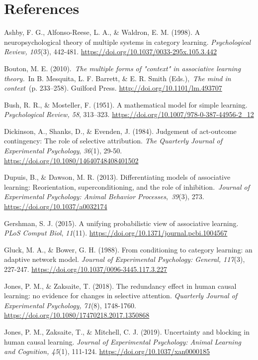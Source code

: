 \documentclass[twocolumn]{article}
\begin{document}
\section*{References}

\begin{hangparas}{1em}{1}

Ashby, F. G., Alfonso-Reese, L. A., \& Waldron, E. M. (1998). A
neuropsychological theory of multiple systems in category learning.
\emph{Psychological Review, 105}(3), 442-481.
\url{https://doi.org/10.1037/0033-295x.105.3.442}

Bouton, M. E. (2010).~\emph{\emph{The multiple forms of "context" in
associative learning theory.}}~In B. Mesquita, L. F. Barrett, \& E. R.
Smith (Eds.),~\emph{\emph{The mind in context}}~(p. 233--258). Guilford
Press. \url{http://doi.org/10.1101/lm.493707}

Bush, R. R., \& Mosteller, F. (1951). A mathematical model for simple
learning. \emph{Psychological Review, 58}, 313--323.
\url{https://doi.org/10.1007/978-0-387-44956-2_12}

Dickinson, A., Shanks, D., \& Evenden, J. (1984). Judgement of
act-outcome contingency: The role of selective attribution. \emph{The
Quarterly Journal of Experimental Psychology}, \emph{36}(1), 29-50.
\url{https://doi.org/10.1080/14640748408401502}

Dupuis, B., \& Dawson, M. R. (2013). Differentiating models of
associative learning: Reorientation, superconditioning, and the role of
inhibition.~\emph{Journal of Experimental Psychology: Animal Behavior
Processes},~\emph{39}(3), 273. \url{https://doi.org/10.1037/a0032174}

Gershman, S. J. (2015). A unifying probabilistic view of associative
learning. \emph{PLoS Comput Biol}, \emph{11}(11).
\protect\hypertarget{anchor-1}{}{}\url{https://doi.org/10.1371/journal.pcbi.1004567}

Gluck, M. A., \& Bower, G. H. (1988). From conditioning to category
learning: an adaptive network model. \emph{Journal of Experimental
Psychology: General, 117}(3), 227-247.
\url{https://doi.org/10.1037/0096-3445.117.3.227}

Jones, P. M., \& Zaksaite, T. (2018). The redundancy effect in human
causal learning: no evidence for changes in selective attention.
\emph{Quarterly Journal of Experimental Psychology, 71}(8), 1748-1760.
\url{https://doi.org/10.1080/17470218.2017.1350868}

Jones, P. M., Zaksaite, T., \& Mitchell, C. J. (2019). Uncertainty and
blocking in human causal learning. \emph{Journal of Experimental
Psychology: Animal Learning and Cognition, 45}(1), 111-124.
\url{https://doi.org/10.1037/xan0000185}


\end{hangparas}
\end{document}
